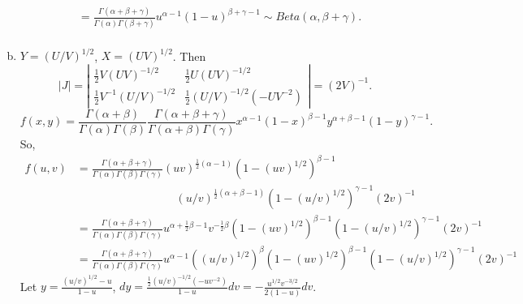 \documentclass[14pt]{elegantbook}
\begin{document}
\begin{solution}
\begin{enumerate}[(a)]
\begin{align*}
                &=\frac{\Gamma(\alpha+\beta+\gamma)}{\Gamma(\alpha)\Gamma(\beta+\gamma)}u^{\alpha-1}(1-u)^{\beta+\gamma-1} \sim Beta(\alpha, \beta+\gamma). \\
            \end{align*}
            \item $Y=(U/V)^{1/2}$, $X=(UV)^{1/2}$. Then
            \[|J|=\left|\begin{matrix}
                \frac{1}{2}V(UV)^{-1/2}&\frac{1}{2}U(UV)^{-1/2}\\
                \frac{1}{2}V^{-1}(U/V)^{-1/2}&\frac{1}{2}(U/V)^{-1/2}(-UV^{-2})
            \end{matrix}\right|=(2V)^{-1}. \]
            \[f(x,y)=\frac{\Gamma(\alpha+\beta)}{\Gamma(\alpha)\Gamma(\beta)}\frac{\Gamma(\alpha+\beta+\gamma)}{\Gamma(\alpha+\beta)\Gamma(\gamma)}x^{\alpha-1}(1-x)^{\beta-1}y^{\alpha+\beta-1}(1-y)^{\gamma-1}. \]
            So, 
            \begin{align*}
                f(u, v)&=\frac{\Gamma(\alpha+\beta+\gamma)}{\Gamma(\alpha)\Gamma(\beta)\Gamma(\gamma)}(uv)^{\frac{1}{2}(\alpha-1)}(1-(uv)^{1/2})^{\beta-1}\\
                &\hspace{105pt}(u/v)^{\frac{1}{2}(\alpha+\beta-1)}(1-(u/v)^{1/2})^{\gamma-1}(2v)^{-1}\\
                &=\frac{\Gamma(\alpha+\beta+\gamma)}{\Gamma(\alpha)\Gamma(\beta)\Gamma(\gamma)}u^{\alpha+\frac{1}{2}\beta-1}v^{-\frac{1}{2}\beta}(1-(uv)^{1/2})^{\beta-1}(1-(u/v)^{1/2})^{\gamma-1}(2v)^{-1}\\
                &=\frac{\Gamma(\alpha+\beta+\gamma)}{\Gamma(\alpha)\Gamma(\beta)\Gamma(\gamma)}u^{\alpha-1}((u/v)^{1/2})^{\beta}(1-(uv)^{1/2})^{\beta-1}(1-(u/v)^{1/2})^{\gamma-1}(2v)^{-1}
            \end{align*}
            Let $y=\frac{(u/v)^{1/2}-u}{1-u}$, $dy=\frac{\frac{1}{2}(u/v)^{-1/2}(-uv^{-2})}{1-u}dv=-\frac{u^{1/2}v^{-3/2}}{2(1-u)}dv$. 
            

\end{enumerate}
\end{solution}
\end{document}
